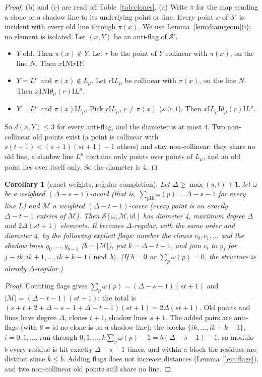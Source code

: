 \documentclass[11pt]{amsart}
\newtheorem{corollary}[theorem]{Corollary}
\theoremstyle{definition}
\theoremstyle{remark}
\numberwithin{equation}{section}
\newcommand{\I}{\mathrel{\mathrm I}}
\newcommand{\cM}{\mathcal M}
\newcommand{\cS}{\mathcal S}
\begin{document}
\begin{proof}
(b) and (c) are read off Table~\ref{tab:clones}. (a) Write $\pi$ for the map sending a clone or a shadow line to its
underlying point or line. Every point $x$ of $\cS'$ is incident with every old line through $\pi(x)$. We use
Lemma~\ref{lem:diamgeom}(i); no element is isolated. Let $(x,Y)$ be an anti-flag of $\cS'$.
\begin{itemize}
\item $Y$ old. Then $\pi(x)\notin Y$. Let $r$ be the point of $Y$ collinear with $\pi(x)$, on the line $N$. Then
  $x\I N\I r\I Y$.
\item $Y=L^\mu$ and $\pi(x)\notin L_\mu$. Let $r\I L_\mu$ be collinear with $\pi(x)$, on the line $N$. Then $x\I N\I
  \theta_\mu(r)\I L^\mu$.
\item $Y=L^\mu$ and $\pi(x)\I L_\mu$. Pick $r\I L_\mu$, $r\ne\pi(x)$ ($s\ge1$). Then $x\I L_\mu\I\theta_\mu(r)\I L^\mu$.
\end{itemize}
So $d(x,Y)\le3$ for every anti-flag, and the diameter is at most 4. Two non-collinear old points exist (a point is
collinear with $s(t+1)<(s+1)(st+1)-1$ others) and stay non-collinear: they share no old line, a shadow line $L^\mu$
contains only points over points of $L_\mu$, and an old point lies over itself only. So the diameter is 4.
\end{proof}

\begin{corollary}[exact weights, regular completion]\label{cor:exact}
Let $\Delta\ge\max(s,t)+1$, let $\omega$ be a weighted $(\Delta-s-1)$-ovoid (that is,
$\sum_{p\I L}\omega(p)=\Delta-s-1$ for every line $L$) and $\cM$ a weighted $(\Delta-t-1)$-cover (every point is on
exactly $\Delta-t-1$ entries of $\cM$). Then $\cS[\omega,\cM,\mathrm{id}]$ has diameter 4, maximum degree $\Delta$ and
$2\Delta(st+1)$ elements. It becomes $\Delta$-regular, with the same order and diameter 4, by the following explicit
flags: number the clones $c_0,c_1,\dots$ and the shadow lines $y_0,\dots,y_{b-1}$ ($b=|\cM|$), put $k=\Delta-t-1$, and
join $c_i$ to $y_j$ for $j\equiv ik,ik+1,\dots,ik+k-1\pmod b$. (If $b=0$ or $\sum_p\omega(p)=0$, the structure is already
$\Delta$-regular.)
\end{corollary}

\begin{proof}
Counting flags gives $\sum_p\omega(p)=(\Delta-s-1)(st+1)$ and $|\cM|=(\Delta-t-1)(st+1)$; the total is
$(s+t+2+\Delta-s-1+\Delta-t-1)(st+1)=2\Delta(st+1)$. Old points and lines have degree $\Delta$, clones $t+1$, shadow lines
$s+1$. The added pairs are anti-flags (with $\theta=\mathrm{id}$ no clone is on a shadow line); the blocks
$\{ik,\dots,ik+k-1\}$, $i=0,1,\dots$, run through $0,1,\dots,k\sum_p\omega(p)-1=b(\Delta-s-1)-1$, so modulo $b$ every
residue is hit exactly $\Delta-s-1$ times, and within a block the residues are distinct since $k\le b$. Adding flags
does not increase distances (Lemma~\ref{lem:flags}), and two non-collinear old points still share no line.
\end{proof}
\end{document}
